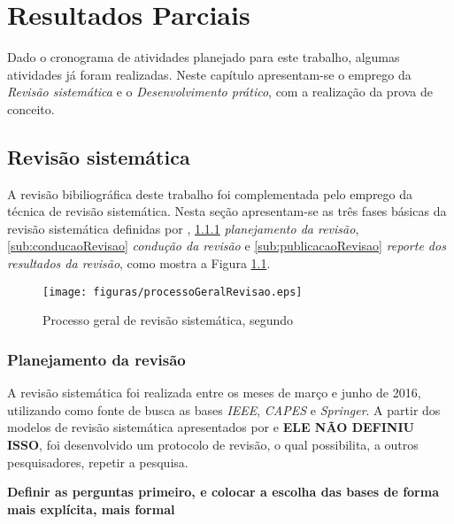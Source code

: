 \chapter[Resultados parciais]{Resultados Parciais}
\label{sec:resultados_parciais}

Dado o cronograma de atividades planejado para este trabalho, algumas atividades já foram realizadas. Neste capítulo apresentam-se o emprego da \textit{Revisão sistemática} e o \textit{Desenvolvimento prático}, com a realização da prova de conceito.

\section{Revisão sistemática} %
\label{sec:revisão_sistemática}

	A revisão bibiliográfica deste trabalho foi complementada pelo emprego da técnica de revisão sistemática. Nesta seção apresentam-se as três fases básicas da revisão sistemática definidas por \cite{Kitchenham}, \ref{sub:planejamentoRevisao} \textit{planejamento da revisão}, \ref{sub:conducaoRevisao} \textit{condução da revisão} e \ref{sub:publicacaoRevisao} \textit{reporte dos resultados da revisão}, como mostra a Figura \ref{img:processoGeralRevisao}.

	\begin{figure}[H]
			\centering
			\texttt{[image: figuras/processoGeralRevisao.eps]}
			\caption[Processo geral de revisão sistemática]{Processo geral de revisão sistemática, segundo \cite{Kitchenham}}
			\label{img:processoGeralRevisao}
		\end{figure}

	\subsection{Planejamento da revisão} %
	\label{sub:planejamentoRevisao}

		A revisão sistemática foi realizada entre os meses de março e junho de 2016, utilizando como fonte de busca as bases \textit{IEEE}, \textit{CAPES} e \textit{Springer}. A partir dos modelos de revisão sistemática apresentados por \cite{Kitchenham} e \cite{exemploRevisaoSistematica}\textbf{ELE NÃO DEFINIU ISSO}, foi desenvolvido um protocolo de revisão, o qual possibilita, a outros pesquisadores, repetir a pesquisa.

		\textbf{Definir as perguntas primeiro, e colocar a escolha das bases de forma mais explícita, mais formal}

